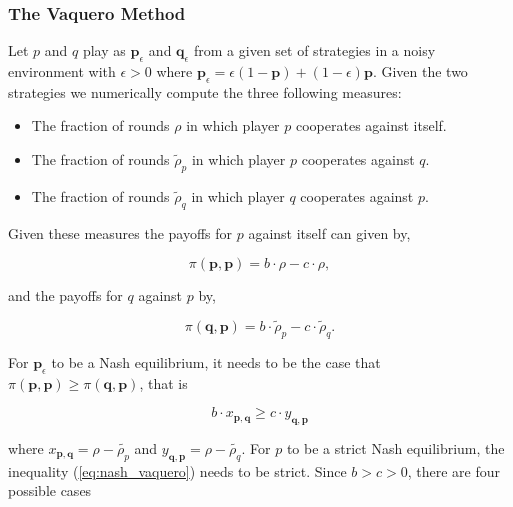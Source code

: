 \documentclass{article}
\theoremstyle{definition}
\begin{document}
\subsubsection{The Vaquero Method}

Let \(p\) and \(q\) play as \(\mathbf{p}_{\epsilon}\) and
\(\mathbf{q}_{\epsilon}\) from a given set of strategies in a noisy environment
with \(\epsilon > 0\) where \(\mathbf{p}_{\epsilon} = \epsilon(1 - \mathbf{p}) +
(1 - \epsilon)\mathbf{p} \). Given the two strategies we numerically compute
the three following measures:


\begin{itemize}
  \item The fraction of rounds \(\rho\) in which player \(p\) cooperates against itself.
  \item The fraction of rounds \(\tilde{\rho}_p\) in which player \(p\) cooperates against \(q\).
  \item The fraction of rounds \(\tilde{\rho}_q\) in which player \(q\) cooperates against \(p\).
\end{itemize}

Given these measures the payoffs for \(p\) against itself can given by,

\[\pi (\mathbf{p}, \mathbf{p}) = b \cdot \rho - c\cdot\rho,\]

and the payoffs for \(q\) against \(p\) by,

\[\pi(\mathbf{q}, \mathbf{p}) = b \cdot \tilde{\rho}_p - c\cdot\tilde{\rho}_q.\]

For \(\mathbf{p}_{\epsilon}\) to be a Nash equilibrium, it needs to be the case that \(\pi (\mathbf{p}, \mathbf{p}) \geq
\pi(\mathbf{q}, \mathbf{p})\), that is

\begin{equation}\label{eq:nash_vaquero}
  b \cdot x_{\mathbf{p}, \mathbf{q}} \geq c \cdot y_{\mathbf{q}, \mathbf{p}}
\end{equation}

where \(x_{\mathbf{p}, \mathbf{q}} = \rho - \tilde{\rho_p}\) and  \(y_{\mathbf{q}, \mathbf{p}} = \rho - \tilde{\rho_q}\).
For \(p\) to be a strict Nash equilibrium, the inequality (\ref{eq:nash_vaquero}) needs
to be strict. Since \(b > c > 0\), there are four possible cases
\end{document}
